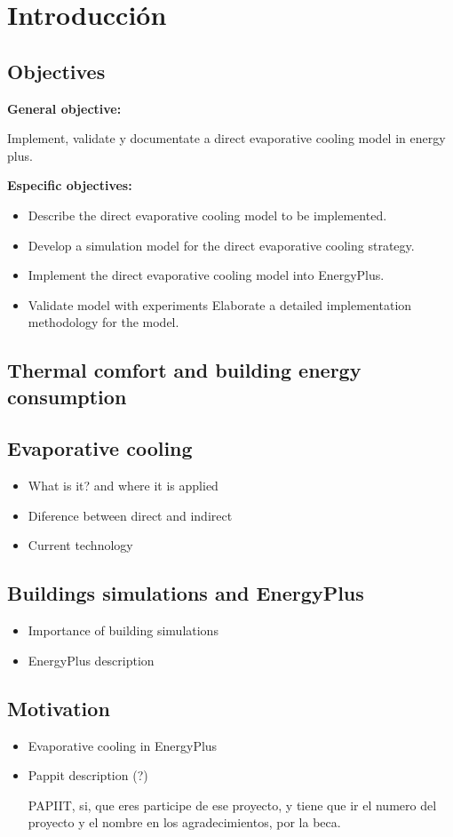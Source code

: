 \chapter{Introducción}
\label{chap:introduccion}

 
 \section{Objectives}
 
 \textbf{General objective:}
 
 Implement, validate y documentate a direct evaporative cooling model in energy plus.
 
 
 \textbf{Especific objectives:}
 
 \begin{itemize}
 \item Describe the direct evaporative cooling model to be implemented.
 \item Develop a simulation model for the direct evaporative cooling strategy.
 \item Implement the direct  evaporative cooling model into EnergyPlus.
\item Validate model with experiments 
Elaborate a detailed implementation methodology for the model.

 \end{itemize}
 
 
 \section{Thermal comfort and building energy consumption}
 
 \section{Evaporative cooling}
 
 \begin{itemize}
 	\item What is it? and where it is applied 
 	\item Diference between direct and indirect
 	\item Current technology
 \end{itemize}
 
 \section{Buildings simulations and EnergyPlus}
  
   \begin{itemize}
 	\item Importance of building simulations
 	\item EnergyPlus description
   \end{itemize}
 
 \section{Motivation}
 
   \begin{itemize}
 	\item Evaporative cooling in EnergyPlus
 	\item Pappit description (?)
 	
 	
 	PAPIIT, si, que eres participe de ese 		proyecto, y tiene que ir el numero del 		proyecto y el nombre en los 				agradecimientos, por la beca.
 	
   \end{itemize}